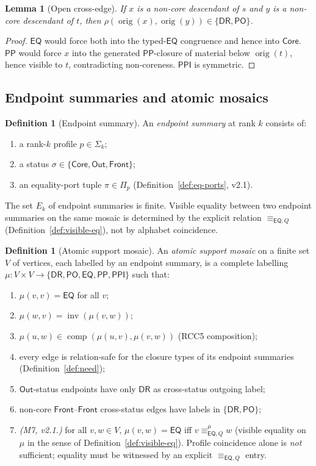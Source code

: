\documentclass[11pt]{article}
\newtheorem{lemma}[theorem]{Lemma}
\theoremstyle{definition}
\newtheorem{definition}[theorem]{Definition}
\theoremstyle{remark}
\newcommand{\DR}{\mathsf{DR}}
\newcommand{\PO}{\mathsf{PO}}
\newcommand{\PP}{\mathsf{PP}}
\newcommand{\PPI}{\mathsf{PPI}}
\newcommand{\EQ}{\mathsf{EQ}}
\newcommand{\Base}{\{\DR,\PO,\EQ,\PP,\PPI\}}
\newcommand{\comp}{\operatorname{comp}}
\newcommand{\inv}{\operatorname{inv}}
\newcommand{\orig}{\operatorname{orig}}
\newcommand{\Core}{\mathsf{Core}}
\newcommand{\Out}{\mathsf{Out}}
\newcommand{\Front}{\mathsf{Front}}
\newcommand{\eqQ}{\equiv_{\EQ,Q}}
\begin{document}
\begin{lemma}[Open cross-edge]\label{lem:open-cross}
If $x$ is a non-core descendant of $s$ and $y$ is a non-core
descendant of $t$, then $\rho(\orig(x),\orig(y)) \in \{\DR,\PO\}$.
\end{lemma}

\begin{proof}
$\EQ$ would force both into the typed-$\EQ$ congruence and hence
into $\Core$.  $\PP$ would force $x$ into the generated
$\PP$-closure of material below $\orig(t)$, hence visible to $t$,
contradicting non-coreness.  $\PPI$ is symmetric.
\end{proof}

\subsection{Endpoint summaries and atomic mosaics}

\begin{definition}[Endpoint summary]\label{def:endpoint}
An \emph{endpoint summary} at rank $k$ consists of:
\begin{enumerate}
\item a rank-$k$ profile $p \in \Sigma_k$;
\item a status $\sigma \in \{\Core,\Out,\Front\}$;
\item an equality-port tuple $\pi \in \Pi_p$
  (Definition~\ref{def:eq-ports}, v2.1).
\end{enumerate}
The set $E_k$ of endpoint summaries is finite.  Visible equality
between two endpoint summaries on the same mosaic is determined by
the explicit relation $\eqQ$ (Definition~\ref{def:visible-eq}), not
by alphabet coincidence.
\end{definition}

\begin{definition}[Atomic support mosaic]\label{def:mosaic}
An \emph{atomic support mosaic} on a finite set $V$ of vertices,
each labelled by an endpoint summary, is a complete labelling
$\mu : V \times V \to \Base$ such that:
\begin{enumerate}[label=(M\arabic*),leftmargin=2em]
\item $\mu(v,v) = \EQ$ for all $v$;
\item $\mu(w,v) = \inv(\mu(v,w))$;
\item $\mu(u,w) \in \comp(\mu(u,v),\mu(v,w))$ (RCC5 composition);
\item every edge is relation-safe for the closure types of its
  endpoint summaries (Definition~\ref{def:need});
\item $\Out$-status endpoints have only $\DR$ as cross-status
  outgoing label;
\item non-core $\Front$--$\Front$ cross-status edges have labels in
  $\{\DR,\PO\}$;
\item \emph{(M7, v2.1.)}\; for all $v,w\in V$,
  $\mu(v,w) = \EQ$ iff $v\mathrel{\eqQ^\mu} w$
  (visible equality on $\mu$ in the sense of
  Definition~\ref{def:visible-eq}).  Profile coincidence alone is
  \emph{not} sufficient; equality must be witnessed by an explicit
  $\eqQ$ entry.
\end{enumerate}
\end{definition}
\end{document}

